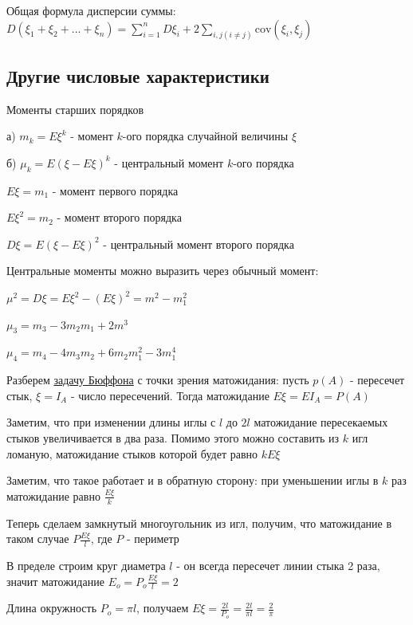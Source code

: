 \documentclass[12pt]{article}
\begin{document}
     Общая формула дисперсии суммы: $D(\xi_1 + \xi_2 + \dots + \xi_n) = \sum_{i = 1}^n D \xi_i + 2\sum_{i, j (i \neq j)} \mathrm{cov} (\xi_i, \xi_j)$

    \subsection{Другие числовые характеристики}

    Моменты старших порядков

    а) $m_k = E\xi^k$ - момент $k$-ого порядка случайной величины $\xi$

    б) $\mu_k = E(\xi - E\xi)^k$ - центральный момент $k$-ого порядка

    $E\xi = m_1$ - момент первого порядка

    $E\xi^2 = m_2$ - момент второго порядка

    $D\xi = E(\xi - E\xi)^2$ - центральный момент второго порядка

    \Nota Центральные моменты можно выразить через обычный момент:

    $\mu^2 = D\xi = E\xi^2 - (E\xi)^2 = m^2 - m_1^2$

    $\mu_3 = m_3 - 3m_2 m_1 + 2m^3$

    $\mu_4 = m_4 - 4m_3 m_2 + 6m_2 m_1^2 - 3m_1^4$

    \Ex Разберем \hyperlink{buffonsproblem}{задачу Бюффона} с точки зрения матожидания: пусть $p(A)$ - пересечет стык,
    $\xi = I_A$ - число пересечений. Тогда матожидание $E\xi = E I_A = P(A)$

    Заметим, что при изменении длины иглы с $l$ до $2l$ матожидание пересекаемых стыков увеличивается
    в два раза. Помимо этого можно составить из $k$ игл ломаную, матожидание стыков которой будет равно $kE\xi$

    Заметим, что такое работает и в обратную сторону: при уменьшении иглы в $k$ раз матожидание равно $\frac{E\xi}{k}$

    Теперь сделаем замкнутый многоугольник из игл, получим, что матожидание в таком случае $P\frac{E\xi}{l}$, где $P$ - периметр

    В пределе строим круг диаметра $l$ - он всегда пересечет линии стыка 2 раза, значит матожидание $E_o = P_o\frac{E\xi}{l} = 2$

    Длина окружность $P_o = \pi l$, получаем $E\xi = \frac{2l}{P_o} = \frac{2l}{\pi l} = \frac{2}{\pi}$
\end{document}
